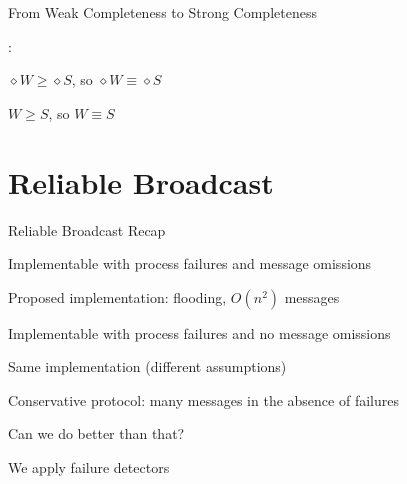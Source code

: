 \begin{frame}{From Weak Completeness to Strong Completeness}

\begin{Procedure}
\caption{Reduction from class $D$ to class $E$, executed by process $p_i$}	
	
\BlankLine
{}
\BlankLine
{}
\end{Procedure}	

:
\BI
\item $\diamond W \geq \diamond S$, so $\diamond W \equiv \diamond S$
\item $W \geq S$, so $W \equiv S$
\EI

\end{frame}


\section{Reliable Broadcast}

\begin{frame}{Reliable Broadcast Recap}
	

\BI
  \item Implementable with process failures and message omissions
  \item Proposed implementation: flooding, $O(n^2)$ messages
\EI

\bigskip
{}

\BI
\item Implementable with process failures and no message omissions
\item Same implementation (different assumptions)
\EI

\bigskip
{}

\BI
\item Conservative protocol: many messages in the absence of failures
\item Can we do better than that?
\item We apply failure detectors
\EI

\end{frame}

